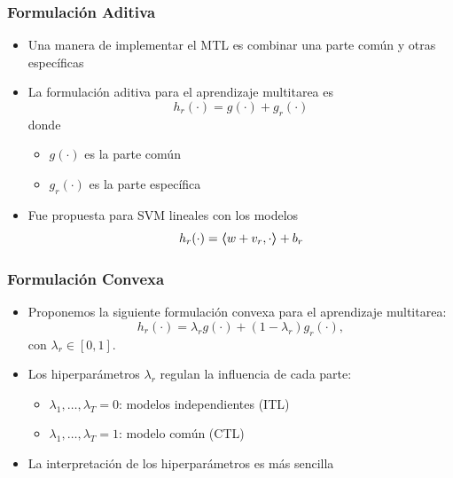 \documentclass[aspectratio=43]{beamer}
\newcommand\Mark[2][8.4]{%
  \rlap{\tikz[baseline=(current bounding box.south)]{
        \shade[left color=darkgray, right color=maincolor!#2!darkgray]
               (0,0) rectangle ++(#1*#2/100,0.3);}%
  }%
}
\newcommand{\dotp}[2]{\bm{\left\langle} #1, #2 \bm{\right\rangle}}
\newcommand{\ntasks}{T}
\begin{document}
\begin{frame}
    \frametitle{Formulación Aditiva}

    \begin{itemize}
        \item Una manera de implementar el MTL es combinar una parte común y otras específicas
        \item La formulación aditiva para el aprendizaje multitarea es
        \begin{equation}
            \nonumber
            h_r(\cdot) = g(\cdot) + g_r(\cdot) 
        \end{equation}
        donde
        \begin{itemize}
            \item $g(\cdot)$ es la parte común
            \item $g_r(\cdot)$ es la parte específica
        \end{itemize}
        \item Fue propuesta para SVM lineales con los modelos
        \begin{equation}
            \nonumber
            h_r(\cdot) = \dotp{w + v_r}{\cdot} + b_r
        \end{equation}
    \end{itemize}
    
\end{frame}

  

\begin{frame}
      \frametitle{Formulación Convexa}
  
      \begin{itemize}
          \item Proponemos la siguiente formulación convexa para el aprendizaje multitarea:
          \begin{equation}
              \nonumber
              h_r(\cdot) = \lambda_r g(\cdot) + (1 - \lambda_r) g_r(\cdot) ,
          \end{equation}
          con $\lambda_r \in [0,1]$.
          \item Los hiperparámetros $\lambda_r$ regulan la influencia de cada parte:
          \begin{itemize}
              \item $\lambda_1, \ldots, \lambda_\ntasks=0$: modelos independientes (ITL)
              \item $\lambda_1, \ldots, \lambda_\ntasks=1$: modelo común (CTL)
          \end{itemize}
          \item La interpretación de los hiperparámetros es más sencilla \\
      \end{itemize}
      
  \end{frame}
\end{document}
